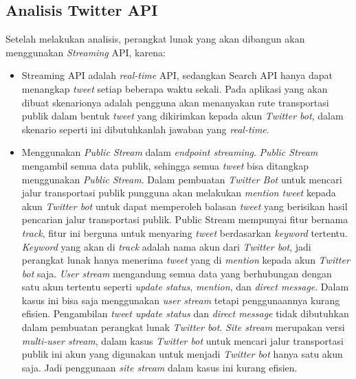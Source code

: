 \subsection{Analisis Twitter API}
Setelah melakukan analisis, perangkat lunak yang akan dibangun akan menggunakan \textit{Streaming} API, karena:
\begin{itemize}
	\item Streaming API adalah \textit{real-time} API, sedangkan Search API hanya dapat menangkap \textit{tweet} setiap beberapa waktu sekali. Pada aplikasi yang akan dibuat skenarionya adalah pengguna akan menanyakan rute transportasi publik dalam bentuk \textit{tweet} yang dikirimkan kepada akun \textit{Twitter bot}, dalam skenario seperti ini dibutuhkanlah jawaban yang \textit{real-time}.
	\item Menggunakan \textit{Public Stream} dalam \textit{endpoint streaming}. \textit{Public Stream} mengambil semua data publik, sehingga semua \textit{tweet} bisa ditangkap menggunakan \textit{Public Stream}. Dalam pembuatan \textit{Twitter Bot} untuk mencari jalur transportasi publik pungguna akan melakukan \textit{mention tweet} kepada akun \textit{Twitter bot} untuk dapat memperoleh balasan \textit{tweet} yang berisikan hasil pencarian jalur transportasi publik. Public Stream mempunyai fitur bernama \textit{track}, fitur ini berguna untuk menyaring \textit{tweet} berdasarkan \textit{keyword} tertentu. \textit{Keyword} yang akan di \textit{track} adalah nama akun dari \textit{Twitter bot}, jadi perangkat lunak hanya menerima \textit{tweet} yang di \textit{mention} kepada akun \textit{Twitter bot} saja. \textit{User stream} mengandung semua data yang berhubungan dengan satu akun tertentu seperti \textit{update status}, \textit{mention}, dan \textit{direct message}. Dalam kasus ini bisa saja menggunakan \textit{user stream} tetapi penggunaannya kurang efisien. Pengambilan \textit{tweet update status} dan \textit{direct message} tidak dibutuhkan dalam pembuatan perangkat lunak \textit{Twitter bot}. \textit{Site stream} merupakan versi \textit{multi-user stream}, dalam kasus \textit{Twitter bot} untuk mencari jalur transportasi publik ini akun yang digunakan untuk menjadi \textit{Twitter bot} hanya satu akun saja. Jadi penggunaan \textit{site stream} dalam kasus ini kurang efisien.
\end{itemize}

